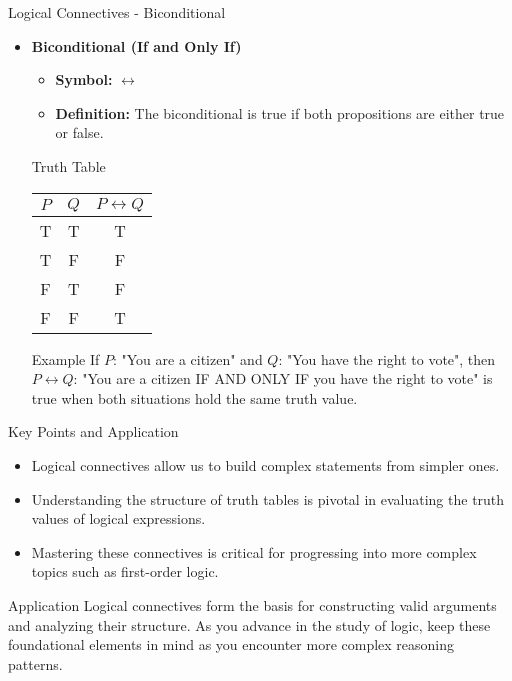 \documentclass[aspectratio=169]{beamer}
\begin{document}
\begin{frame}[fragile]{Logical Connectives - Biconditional}
    \begin{itemize}
        \item \textbf{Biconditional (If and Only If)}
            \begin{itemize}
                \item \textbf{Symbol:} $\leftrightarrow$
                \item \textbf{Definition:} The biconditional is true if both propositions are either true or false.
            \end{itemize}
            \begin{block}{Truth Table}
                \begin{tabular}{|c|c|c|}
                    \hline
                    $P$ & $Q$ & $P \leftrightarrow Q$ \\
                    \hline
                    T & T & T \\
                    T & F & F \\
                    F & T & F \\
                    F & F & T \\
                    \hline
                \end{tabular}
            \end{block}
            \begin{block}{Example}
                If $P$: "You are a citizen" and $Q$: "You have the right to vote", then $P \leftrightarrow Q$: "You are a citizen IF AND ONLY IF you have the right to vote" is true when both situations hold the same truth value.
            \end{block}
    \end{itemize}
\end{frame}

\begin{frame}[fragile]{Key Points and Application}
    \begin{itemize}
        \item Logical connectives allow us to build complex statements from simpler ones.
        \item Understanding the structure of truth tables is pivotal in evaluating the truth values of logical expressions.
        \item Mastering these connectives is critical for progressing into more complex topics such as first-order logic.
    \end{itemize}
    \begin{block}{Application}
        Logical connectives form the basis for constructing valid arguments and analyzing their structure. As you advance in the study of logic, keep these foundational elements in mind as you encounter more complex reasoning patterns.
    \end{block}
\end{frame}
\end{document}
